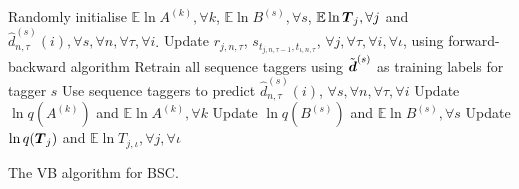 \begin{algorithm}[t]
\DontPrintSemicolon
 \nl Randomly initialise $\mathbb{E}\ln A^{(k)},\forall k$,
 $\mathbb{E}\ln B^{(s)},\forall s$, $\mathbb{E}\ln \boldsymbol T_j,\forall j$ 
 and $\hat{d}^{(s)}_{n,\tau}(i), \forall s,\forall n,\forall \tau,\forall i$.\;
 {
 \nl Update $r_{j,n,\tau}$, $s_{t_{j,n,\tau\!-\!1}, t_{\iota,n,\tau}}$, $\forall j,\forall \tau,\forall i,\forall \iota$,
 using forward-backward algorithm\;%
 \nl Retrain all sequence taggers using $\tilde{\boldsymbol d}^{(s)}$ as training labels for tagger $s$\;
 \nl Use sequence taggers to predict $\hat{d}^{(s)}_{n,\tau}(i)$, $\forall s,\forall n,\forall \tau,\forall i$\;
 \nl Update $\ln q(A^{(k)})$ and $\mathbb{E}\ln A^{(k)},\forall k$ \;%
 \nl Update $\ln q(B^{(s)})$ and $\mathbb{E}\ln B^{(s)},\forall s$ \;%
 \nl Update $\ln q(\boldsymbol T_j)$ and $\mathbb{E}\ln T_{j,\iota},\forall j,\forall \iota$ \;%
 }
\;
\caption{The VB algorithm for BSC.}
\label{al:vb_bac}
\end{algorithm}

